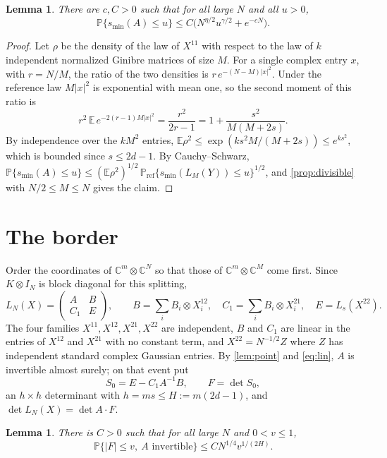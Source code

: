 \documentclass[11pt]{article}
\newtheorem{lemma}[theorem]{Lemma}
\theoremstyle{remark}
\newcommand{\C}{\mathbb C}
\newcommand{\E}{\mathbb E}
\newcommand{\Prob}{\mathbb P}
\newcommand{\smin}{s_{\min}}
\begin{document}
\begin{lemma}\label{lem:core}
There are $c,C>0$ such that for all large $N$ and all $u>0$,
\[
\Prob\{\smin(A)\le u\}\le C\bigl(N^{\eta/2}u^{\gamma/2}+e^{-cN}\bigr).
\]
\end{lemma}

\begin{proof}
Let $\rho$ be the density of the law of $X^{11}$ with respect to the law of $k$ independent normalized Ginibre matrices of size $M$. For a single complex entry $x$, with $r=N/M$, the ratio of the two densities is $r\,e^{-(N-M)|x|^2}$. Under the reference law $M|x|^2$ is exponential with mean one, so the second moment of this ratio is
\[
r^2\,\E\,e^{-2(r-1)M|x|^2}=\frac{r^2}{2r-1}=1+\frac{s^2}{M(M+2s)}.
\]
By independence over the $kM^2$ entries, $\E\rho^2\le\exp(ks^2M/(M+2s))\le e^{ks^2}$, which is bounded since $s\le2d-1$. By Cauchy--Schwarz, $\Prob\{\smin(A)\le u\}\le(\E\rho^2)^{1/2}\,\Prob_{\mathrm{ref}}\{\smin(L_M(Y))\le u\}^{1/2}$, and \cref{prop:divisible} with $N/2\le M\le N$ gives the claim.
\end{proof}

\section{The border}\label{sec:border}

Order the coordinates of $\C^m\otimes\C^N$ so that those of $\C^m\otimes\C^M$ come first. Since $K\otimes I_N$ is block diagonal for this splitting,
\[
L_N(X)=\begin{pmatrix}A&B\\ C_1&E\end{pmatrix},\qquad B=\sum_iB_i\otimes X_i^{12},\quad C_1=\sum_iB_i\otimes X_i^{21},\quad E=L_s(X^{22}).
\]
The four families $X^{11},X^{12},X^{21},X^{22}$ are independent, $B$ and $C_1$ are linear in the entries of $X^{12}$ and $X^{21}$ with no constant term, and $X^{22}=N^{-1/2}Z$ where $Z$ has independent standard complex Gaussian entries. By \cref{lem:point} and \eqref{eq:lin}, $A$ is invertible almost surely; on that event put
\[
S_0=E-C_1A^{-1}B,\qquad F=\det S_0 ,
\]
an $h\times h$ determinant with $h=ms\le H:=m(2d-1)$, and $\det L_N(X)=\det A\cdot F$.

\begin{lemma}\label{lem:border}
There is $C>0$ such that for all large $N$ and $0<v\le1$,
\[
\Prob\{|F|\le v,\ A\text{ invertible}\}\le CN^{1/4}v^{1/(2H)} .
\]
\end{lemma}
\end{document}
